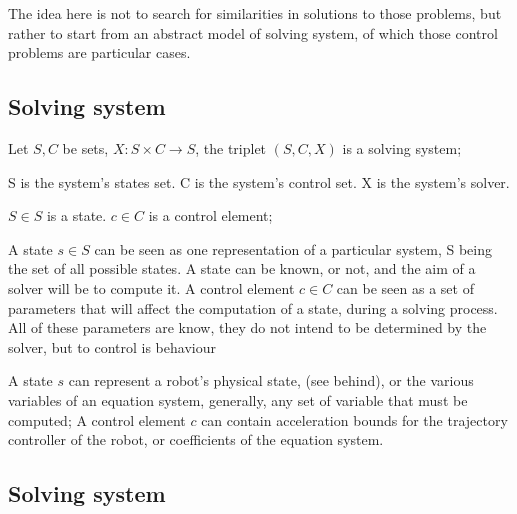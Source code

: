 The idea here is not to search for similarities in solutions to those problems, but rather to start from an abstract
model of solving system, of which those control problems are particular cases.



\subsection{Solving system}

Let $S, C$ be sets, $X : S \times C \rightarrow S$, the triplet $(S, C, X)$ is a solving system;

S is the system's states set.
C is the system's control set.
X is the system's solver.

$S \in S$ is a state.\newline
$c \in C$ is a control element;

A state $s \in S$ can be seen as one representation of a particular system, S being the set of all possible states.
A state can be known, or not, and the aim of a solver will be to compute it.\newline
A control element $c \in C$ can be seen as a set of parameters that will affect the computation of a state, during a solving process.
All of these parameters are know, they do not intend to be determined by the solver, but to control is behaviour


A state $s$ can represent a robot's physical state, (see behind), or the various variables of an equation system,
generally, any set of variable that must be computed;
A control element $c$ can contain acceleration bounds for the trajectory controller of the robot,
or coefficients of the equation system.


\subsection{Solving system}

